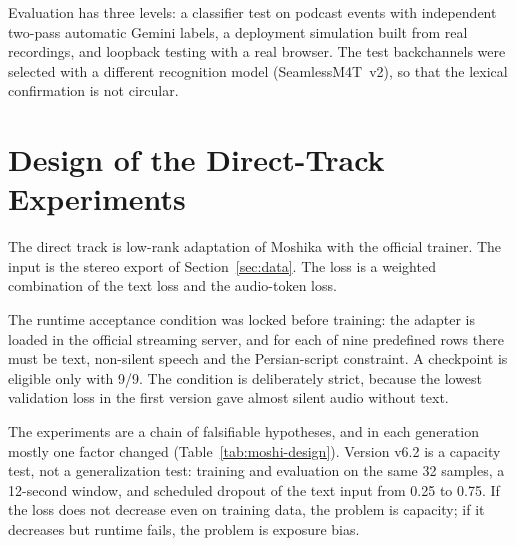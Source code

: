 Evaluation has three levels: a classifier test on podcast events with
independent two-pass automatic Gemini labels, a deployment simulation built from
real recordings, and loopback testing with a real browser. The test
backchannels were selected with a different recognition model
(SeamlessM4T~v2), so that the lexical confirmation is not circular.

\section{Design of the Direct-Track Experiments}
\label{sec:direct}

The direct track is low-rank adaptation of Moshika with the official trainer. The
input is the stereo export of Section~\ref{sec:data}. The loss is a weighted
combination of the text loss and the audio-token loss.

The runtime acceptance condition was locked before training: the adapter is
loaded in the official streaming server, and for each of nine predefined rows
there must be text, non-silent speech and the Persian-script constraint. A
checkpoint is eligible only with 9/9. The condition is deliberately strict,
because the lowest validation loss in the first version gave almost silent audio
without text.

The experiments are a chain of falsifiable hypotheses, and in each generation
mostly one factor changed (Table~\ref{tab:moshi-design}). Version v6.2 is a
capacity test, not a generalization test: training and evaluation on the same
32 samples, a 12-second window, and scheduled dropout of the text input from
0.25 to 0.75. If the loss does not decrease even on training data, the problem
is capacity; if it decreases but runtime fails, the problem is exposure bias.

